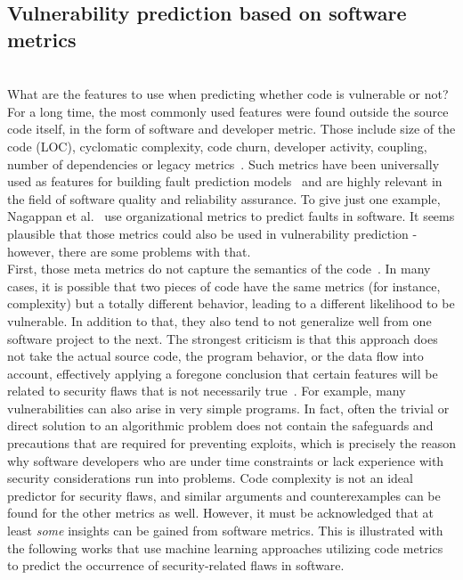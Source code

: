 \documentclass[
a4paper,
pagesize,
pdftex,
12pt,
twoside, %
BCOR=5mm, %
ngerman,
fleqn,
final,
]{scrartcl}
\begin{document}
	\subsection{Vulnerability prediction based on software metrics}\mbox{}\\
	What are the features to use when predicting whether code is vulnerable or not? For a long time, the most commonly used features were found outside the source code itself, in the form of software and developer metric. Those include size of the code (LOC), cyclomatic complexity, code churn, developer activity, coupling, number of dependencies or legacy metrics~\cite{Morrison.2015}. Such metrics have been universally used as features for building fault prediction models~\cite{Hall.2011} and are highly relevant in the field of software quality and reliability assurance. To give just one example, Nagappan et al.~\cite{Nagappan.2008} use organizational metrics to predict faults in software. It seems plausible that those metrics could also be used in vulnerability prediction - however, there are some problems with that.\\
	First, those meta metrics do not capture the semantics of the code~\cite{Shin.2008}. In many cases, it is possible that two pieces of code have the same metrics (for instance, complexity) but a totally different behavior, leading to a different likelihood to be vulnerable. In addition to that, they also tend to not generalize well from one software project to the next. The strongest criticism is that this approach does not take the actual source code, the program behavior, or the data flow into account, effectively applying a foregone conclusion that certain features will be related to security flaws that is not necessarily true~\cite{Hovsepyan.2012}. For example, many vulnerabilities can also arise in very simple programs. In fact, often the trivial or direct solution to an algorithmic problem does not contain the safeguards and precautions that are required for preventing exploits, which is precisely the reason why software developers who are under time constraints or lack experience with security considerations run into problems. Code complexity is not an ideal predictor for security flaws, and similar arguments and counterexamples can be found for the other metrics as well. However, it must be acknowledged that at least \textit{some} insights can be gained from software metrics. This is illustrated with the following works that use machine learning approaches utilizing code metrics to predict the occurrence of security-related flaws in software.\\
\end{document}
